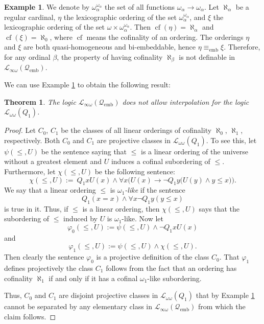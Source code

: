 \documentclass{ndjflart}
\theoremstyle{plain}
\newtheorem{theorem}[conjecture]{Theorem}
\theoremstyle{definition}
\newtheorem{example}[conjecture]{Example}
\numberwithin{equation}{section}
\DeclareMathOperator{\emb}{emb}
\DeclareMathOperator{\cf}{cf}
\begin{document}
\begin{example}\label{cofinality}
We denote by $\omega_{\alpha}^{\omega_{\alpha}}$ the set of all functions
$\omega_{\alpha} \rightarrow \omega_{\alpha}$.
Let $\aleph_{\alpha}$ be a regular cardinal, $\eta$ the lexicographic ordering
of the set $\omega_{\alpha}^{\omega_{\alpha}}$, and $\xi$ the lexicographic
ordering of the set $\omega \times \omega_{\alpha}^{\omega_{\alpha}}$.
Then $\cf(\eta) = \aleph_{\alpha}$ and $\cf(\xi) = \aleph_0$, where $\cf$ means
the cofinality of an ordering.
The orderings $\eta$ and $\xi$ are both quasi-homogeneous  and bi-embeddable,
hence $\eta \equiv_{\emb} \xi$.
Therefore, for any ordinal $\beta$,
the property of having cofinality $\aleph_{\beta}$ is
not definable in $\mathcal{L}_{\infty \omega}(\mathcal{Q}_{\emb})$.
\end{example}

We can use Example \ref{cofinality} to obtain the following result:

\begin{theorem}
The logic $\mathcal{L}_{\infty\omega}(\mathcal{Q}_{\emb})$ does not allow
interpolation for the logic $\mathcal{L}_{\omega\omega}(Q_1)$.
\end{theorem}
\begin{proof}
Let $C_0$, $C_1$ be the classes of all linear orderings of cofinality
$\aleph_0$, $\aleph_1$, respectively.
Both $C_0$ and $C_1$ are projective classes in $\mathcal{L}_{\omega\omega}(Q_1)$.
To see this, let $\psi(\leq,U)$ be the sentence saying that $\leq$ is a linear
ordering of the universe without a greatest element and $U$ induces a cofinal
subordering of $\leq$. Furthermore, let $\chi(\leq,U)$ be the following sentence:
\[
	\chi(\leq,U) := \ Q_1xU(x)
	\wedge \forall x\big(U(x)\rightarrow \neg Q_1y\big(U(y) \wedge y \leq x\big) \big).
\]
We say that a linear ordering $\leq$ is \emph{$\omega_1$-like} if the sentence
\[
	Q_1(x=x) \wedge \forall x \neg Q_1 y(y\leq x)
\]
is true in it.
Thus, if $\leq$ is a linear ordering, then $\chi(\leq,U)$ says that the
subordering of $\leq$ induced by $U$ is $\omega_1$-like. Now let
\[
	\varphi_0(\leq,U) := \psi(\leq,U) \wedge \neg Q_1 x U(x)
\]
and
\[
	\varphi_1(\leq,U) := \psi(\leq,U) \wedge \chi(\leq,U).
\]
Then clearly the sentence $\varphi_0$ is a projective definition of the class $C_0$.
That $\varphi_1$ defines projectively the class $C_1$ follows from the fact that
an ordering has cofinality $\aleph_1$ if and only if it has a cofinal
$\omega_1$-like subordering.

Thus, $C_0$ and $C_1$ are disjoint projective classes in
$\mathcal{L}_{\omega\omega}(Q_1)$ that by Example \ref{cofinality} cannot be
separated by any elementary class in
$\mathcal{L}_{\infty\omega}(\mathcal{Q}_{\emb})$ from which the claim follows.
\end{proof}
\end{document}

